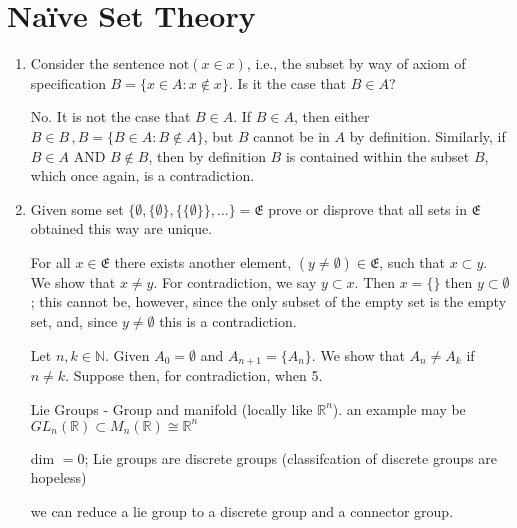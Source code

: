\documentclass{article}
\begin{document}

\section{Na\"ive Set Theory}


\begin{enumerate}
  \item Consider the sentence \( \text{not}(x \in x) \), i.e., the subset by way of axiom of specification \( B=\{ x\in A : x \not \in x \} \). Is it the case that \( B\in A \)? 

    No. It is not the case that \( B\in A \). If \( B\in A \), then either \(B\in B \, , B=\{B\in A : B\not \in A\} \), but \( B \) cannot be in \( A \) by definition. Similarly, if \( B \in A \) AND \( B\not\in B \), then by definition \( B \) is contained within the subset \( B \), which once again, is a contradiction. 










  \item Given some set \( \{ \emptyset, \{ \emptyset \}, \{\{\emptyset\}\},\ldots  \} =\mathfrak{E}\) prove or disprove that all sets in \( \mathfrak{E} \) obtained this way are unique. 

    For all \( x\in \mathfrak{E} \) there exists another element, \(( y\neq \emptyset )\in \mathfrak{E}\), such that \(x \subset y  \). We show that \( x\neq y \). For contradiction, we say \( y \subset  x \). Then \( x=\{ \} \) then \( y\subset \emptyset \); this cannot be, however, since the only subset of the empty set is the empty set, and, since \( y\neq \emptyset \) this is a contradiction. 


    Let \( n,k \in \mathbb{N} \). Given \( A_{0} = \emptyset\) and \( A_{n+1}=\{A_{n}\}\). We show that \( A_n\neq A_k \) if \( n\neq k \). Suppose then, for contradiction, when 5.


Lie Groups - Group and manifold (locally like \( \mathbb{R}^n \)). an example may be \( GL_n(\mathbb{R})\subset M_n (\mathbb{R}) \cong \mathbb{R}^n \)

dim \( =0 \); Lie groups are discrete groups (classifcation of discrete groups are hopeless)

we can reduce a lie group to a discrete group and a connector group. 

\end{enumerate}
\end{document}
